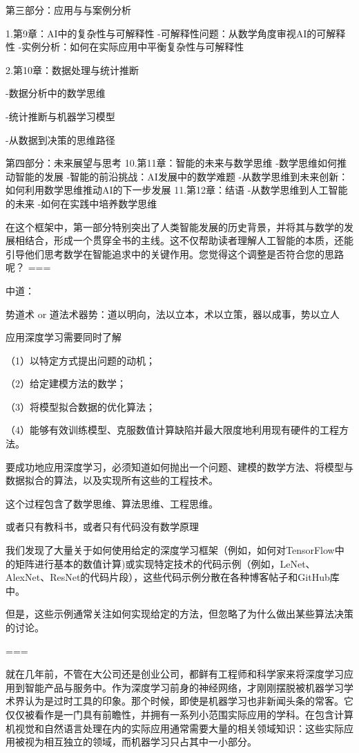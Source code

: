     第三部分：应用与与案例分析

1.第9章：AI中的复杂性与可解释性
-可解释性问题：从数学角度审视AI的可解释性
-实例分析：如何在实际应用中平衡复杂性与可解释性

2.第10章：数据处理与统计推断

-数据分析中的数学思维

-统计推断与机器学习模型

-从数据到决策的思维路径

    第四部分：未来展望与思考
10.第11章：智能的未来与数学思维
-数学思维如何推动智能的发展
-智能的前沿挑战：AI发展中的数学难题
-从数学思维到未来创新：如何利用数学思维推动AI的下一步发展
11.第12章：结语
-从数学思维到人工智能的未来
-如何在实践中培养数学思维




在这个框架中，第一部分特别突出了人类智能发展的历史背景，并将其与数学的发展相结合，形成一个贯穿全书的主线。这不仅帮助读者理解人工智能的本质，还能引导他们思考数学在智能追求中的关键作用。您觉得这个调整是否符合您的思路呢？
===

中道：



势道术 or 道法术器势：道以明向，法以立本，术以立策，器以成事，势以立人





应用深度学习需要同时了解

（1）以特定方式提出问题的动机；

（2）给定建模方法的数学；

（3）将模型拟合数据的优化算法；

（4）能够有效训练模型、克服数值计算缺陷并最大限度地利用现有硬件的工程方法。

要成功地应用深度学习，必须知道如何抛出一个问题、建模的数学方法、将模型与数据拟合的算法，以及实现所有这些的工程技术。

这个过程包含了数学思维、算法思维、工程思维。



或者只有教科书，或者只有代码没有数学原理

我们发现了大量关于如何使用给定的深度学习框架（例如，如何对TensorFlow中的矩阵进行基本的数值计算)或实现特定技术的代码示例（例如，LeNet、AlexNet、ResNet的代码片段），这些代码示例分散在各种博客帖子和GitHub库中。

但是，这些示例通常关注如何实现给定的方法，但忽略了为什么做出某些算法决策的讨论。

===

就在几年前，不管在大公司还是创业公司，都鲜有工程师和科学家来将深度学习应用到智能产品与服务中。作为深度学习前身的神经网络，才刚刚摆脱被机器学习学术界认为是过时工具的印象。那个时候，即使是机器学习也非新闻头条的常客。它仅仅被看作是一门具有前瞻性，并拥有一系列小范围实际应用的学科。在包含计算机视觉和自然语言处理在内的实际应用通常需要大量的相关领域知识：这些实际应用被视为相互独立的领域，而机器学习只占其中一小部分。

